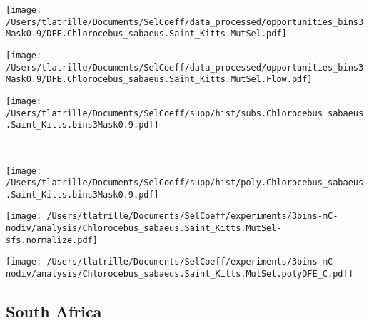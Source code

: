 \documentclass{article}
\begin{document}
    \begin{minipage}{0.32\linewidth}
        \texttt{[image: /Users/tlatrille/Documents/SelCoeff/data\_processed/opportunities\_bins3Mask0.9/DFE.Chlorocebus\_sabaeus.Saint\_Kitts.MutSel.pdf]}
    \end{minipage}
    \begin{minipage}{0.32\linewidth}
        \texttt{[image: /Users/tlatrille/Documents/SelCoeff/data\_processed/opportunities\_bins3Mask0.9/DFE.Chlorocebus\_sabaeus.Saint\_Kitts.MutSel.Flow.pdf]}
    \end{minipage}
    \begin{minipage}{0.32\linewidth}
        \texttt{[image: /Users/tlatrille/Documents/SelCoeff/supp/hist/subs.Chlorocebus\_sabaeus.Saint\_Kitts.bins3Mask0.9.pdf]}
    \end{minipage}
    \\
    \begin{minipage}{0.32\linewidth}
        \texttt{[image: /Users/tlatrille/Documents/SelCoeff/supp/hist/poly.Chlorocebus\_sabaeus.Saint\_Kitts.bins3Mask0.9.pdf]}
    \end{minipage}
    \begin{minipage}{0.32\linewidth}
        \texttt{[image: /Users/tlatrille/Documents/SelCoeff/experiments/3bins-mC-nodiv/analysis/Chlorocebus\_sabaeus.Saint\_Kitts.MutSel-sfs.normalize.pdf]}
    \end{minipage}
    \begin{minipage}{0.32\linewidth}
        \texttt{[image: /Users/tlatrille/Documents/SelCoeff/experiments/3bins-mC-nodiv/analysis/Chlorocebus\_sabaeus.Saint\_Kitts.MutSel.polyDFE\_C.pdf]}
    \end{minipage}
    \subsection{South Africa}
\end{document}
